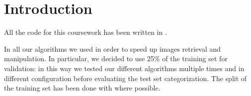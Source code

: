 \section{Introduction}
All the code for this coursework has been written in \MATLAB. 

In all our algorithms we used  in order to speed up images retrieval and manipulation. In particular, we decided to use 25\% of the training set for validation: in this way we tested our different algorithms multiple times and in different configuration before evaluating the test set categorization. The split of the training set has been done with  where possible.